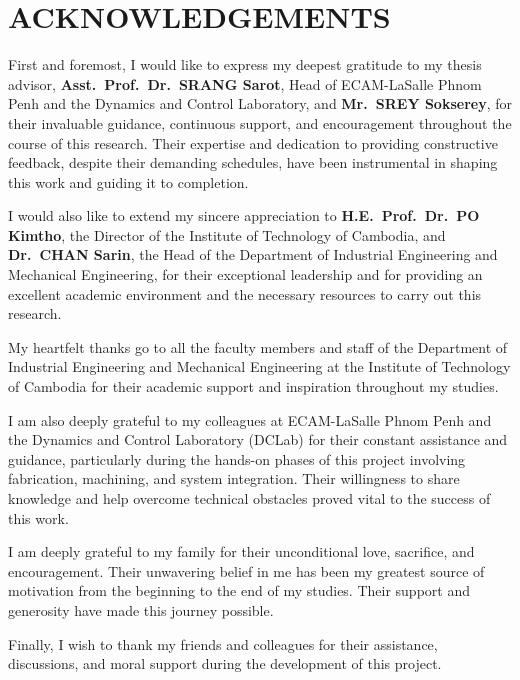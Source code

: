 \section*{\centering ACKNOWLEDGEMENTS}
\hspace{1.27cm}
First and foremost, I would like to express my deepest gratitude to my thesis advisor, \textbf{Asst.\ Prof.\ Dr.\ SRANG Sarot}, Head of ECAM-LaSalle Phnom Penh and the Dynamics and Control Laboratory, and \textbf{Mr.\ SREY Sokserey}, for their invaluable guidance, continuous support, and encouragement throughout the course of this research. Their expertise and dedication to providing constructive feedback, despite their demanding schedules, have been instrumental in shaping this work and guiding it to completion.

\par
\hspace{1.27cm}
I would also like to extend my sincere appreciation to \textbf{H.E.\ Prof.\ Dr.\ PO Kimtho}, the Director of the Institute of Technology of Cambodia, and \textbf{Dr.\ CHAN Sarin}, the Head of the Department of Industrial Engineering and Mechanical Engineering, for their exceptional leadership and for providing an excellent academic environment and the necessary resources to carry out this research.
\par
\hspace{1.27cm}
My heartfelt thanks go to all the faculty members and staff of the Department of Industrial Engineering and Mechanical Engineering at the Institute of Technology of Cambodia for their academic support and inspiration throughout my studies.
\par
\hspace{1.27cm}
I am also deeply grateful to my colleagues at ECAM-LaSalle Phnom Penh and the Dynamics and Control Laboratory (DCLab) for their constant assistance and guidance, particularly during the hands-on phases of this project involving fabrication, machining, and system integration. Their willingness to share knowledge and help overcome technical obstacles proved vital to the success of this work.
\par
\hspace{1.27cm}
I am deeply grateful to my family for their unconditional love, sacrifice, and encouragement. Their unwavering belief in me has been my greatest source of motivation from the beginning to the end of my studies. Their support and generosity have made this journey possible.
\par
\hspace{1.27cm}
Finally, I wish to thank my friends and colleagues for their assistance, discussions, and moral support during the development of this project.